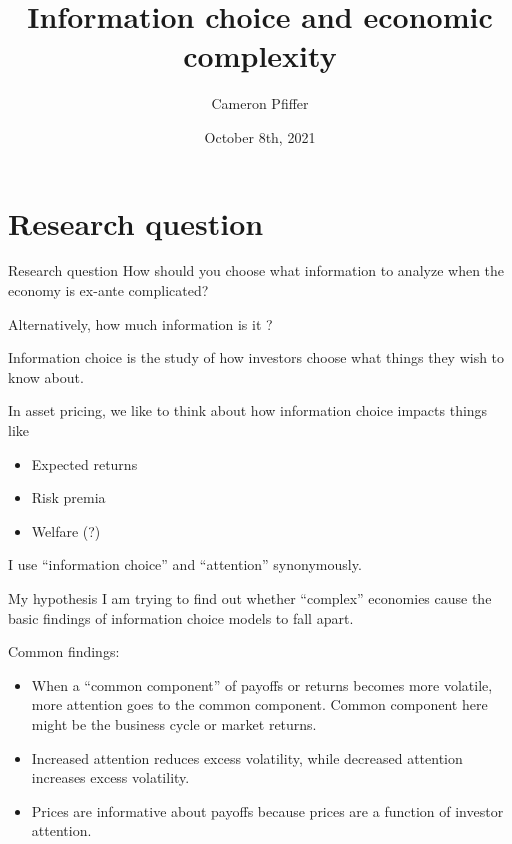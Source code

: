 \documentclass[
  ignorenonframetext,
]{beamer}
\title{Information choice and economic complexity}
\author{Cameron Pfiffer}
\date{October 8th, 2021}
\institute{University of Oregon}
\providecommand{\tightlist}{%
  \setlength{\itemsep}{0pt}\setlength{\parskip}{0pt}}
\begin{document}
\frame{\titlepage}

\begin{frame}
\newcommand{\Gauss}{\mathcal{N}}
\newcommand{\Var}{\text{Var}}
\newcommand{\E}{\text{E}}
\newcommand{\argmax}{\text{argmax}}
\end{frame}

\hypertarget{research-question}{%
\section{Research question}\label{research-question}}

\begin{frame}{Research question}
\protect\hypertarget{research-question-1}{}
How should you choose what information to analyze when the economy is
ex-ante complicated?

Alternatively, how much information is it ?
\end{frame}

\begin{frame}{Information choice}
\protect\hypertarget{information-choice}{}
 is the study of how investors choose what
things they wish to know about.

In asset pricing, we like to think about how information choice impacts
things like

\begin{itemize}
\tightlist
\item
  Expected returns
\item
  Risk premia
\item
  Welfare (?)
\end{itemize}

I use ``information choice'' and ``attention'' synonymously.
\end{frame}

\begin{frame}{My hypothesis}
\protect\hypertarget{my-hypothesis}{}
I am trying to find out whether ``complex'' economies cause the basic
findings of information choice models to fall apart.

Common findings:

\begin{itemize}
\tightlist
\item
  When a ``common component'' of payoffs or returns becomes more
  volatile, more attention goes to the common component. Common
  component here might be the business cycle or market returns.
\item
  Increased attention reduces excess volatility, while decreased
  attention increases excess volatility.
\item
  Prices are informative about payoffs because prices are a function of
  investor attention.
\end{itemize}
\end{frame}
\end{document}
